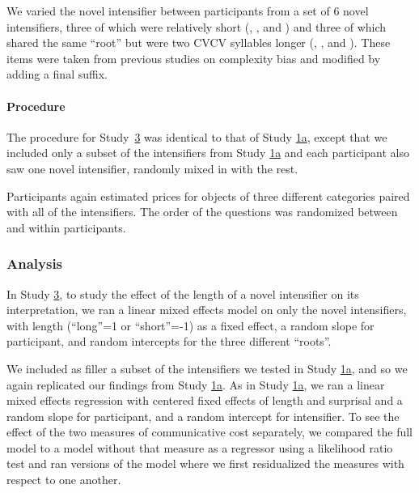 We varied the novel intensifier between participants from a set of 6 novel intensifiers, three of which were relatively short (, , and ) and three of which shared the same ``root'' but were two CVCV syllables longer (, , and ).
These items were taken from previous studies on complexity bias \cite{lewis_conceptual_2016} and modified by adding a final  suffix.

\paragraph{Procedure%
}

The procedure for Study~\hyperref[sec:study3]{3} was identical to that of Study \hyperref[sec:study1a]{1a}, except that we included only a subset of the intensifiers from Study \hyperref[sec:study1a]{1a} and each participant also saw one novel intensifier, randomly mixed in with the rest.

Participants again estimated prices for objects of three different categories paired with all of the intensifiers.
The order of the questions was randomized between and within participants.

\subsubsection{Analysis}

In Study \hyperref[sec:study3]{3},  to study the effect of the length of a novel intensifier on its interpretation, we ran a linear mixed effects model on only the novel intensifiers, with length (``long''=1 or ``short''=-1) as a fixed effect, a random slope for participant, and random intercepts for the three different ``roots''.

We included as filler a subset of the intensifiers we tested in Study \hyperref[sec:study1a]{1a}, and so we again replicated our findings from Study \hyperref[sec:study1a]{1a}.
As in Study \hyperref[sec:study1a]{1a}, we ran a linear mixed effects regression with centered fixed effects of length and surprisal and a random slope for participant, and a random intercept for intensifier.
To see the effect of the two measures of communicative cost separately, we compared the full model to a model without that measure as a regressor using a likelihood ratio test and ran versions of the model where we first residualized the measures with respect to one another.

